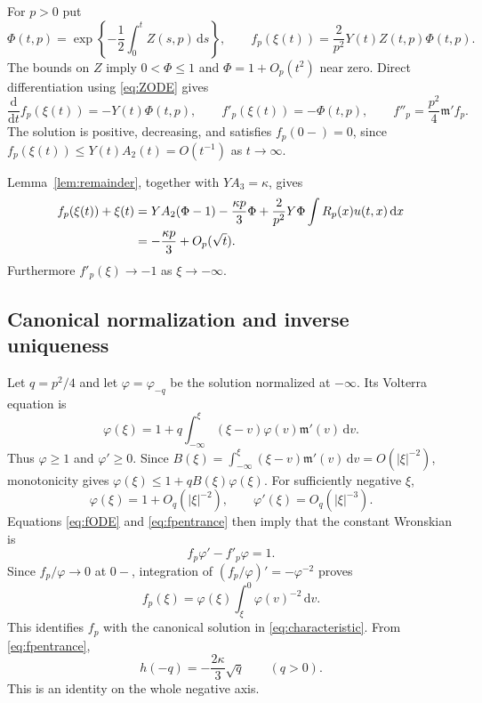 \documentclass[11pt,letterpaper,reqno]{amsart}
\theoremstyle{plain}
\newcommand{\dd}{\,\mathrm d}
\begin{document}
For $p>0$ put
\begin{equation}\label{eq:Phi}
 \Phi(t,p)=\exp\left\{-\frac12\int_0^tZ(s,p)\dd s\right\},\qquad
 f_p(\xi(t))=\frac2{p^2}Y(t)Z(t,p)\Phi(t,p).
\end{equation}
The bounds on $Z$ imply $0<\Phi\le1$ and $\Phi=1+O_p(t^2)$ near zero. Direct differentiation using \eqref{eq:ZODE} gives
\begin{equation}\label{eq:fODE}
 \frac{\mathrm d}{\mathrm dt}f_p(\xi(t))=-Y(t)\Phi(t,p),\qquad
 f'_p(\xi(t))=-\Phi(t,p),\qquad
 f''_p=\frac{p^2}{4}\mathfrak m'f_p.
\end{equation}
The solution is positive, decreasing, and satisfies $f_p(0-)=0$, since
$f_p(\xi(t))\le Y(t)A_2(t)=O(t^{-1})$ as $t\to\infty$.

Lemma~\ref{lem:remainder}, together with $YA_3=\kappa$, gives
\begin{align}\label{eq:fpentrance}
 f_p(\xi(t))+\xi(t)
 &=YA_2(\Phi-1)-\frac{\kappa p}{3}\Phi
   +\frac2{p^2}Y\Phi\int R_p(x)u(t,x)\dd x\notag\\
 &=-\frac{\kappa p}{3}+O_p(\sqrt t).
\end{align}
Furthermore $f'_p(\xi)\to-1$ as $\xi\to-\infty$.

\subsection{Canonical normalization and inverse uniqueness}
Let $q=p^2/4$ and let $\varphi=\varphi_{-q}$ be the solution normalized at $-\infty$. Its Volterra equation is
\[
 \varphi(\xi)=1+q\int_{-\infty}^\xi(\xi-v)\varphi(v)\mathfrak m'(v)\dd v.
\]
Thus $\varphi\ge1$ and $\varphi'\ge0$. Since
$B(\xi)=\int_{-\infty}^\xi(\xi-v)\mathfrak m'(v)\dd v=O(|\xi|^{-2})$, monotonicity gives
$\varphi(\xi)\le1+qB(\xi)\varphi(\xi)$. For sufficiently negative $\xi$,
\[
 \varphi(\xi)=1+O_q(|\xi|^{-2}),\qquad
 \varphi'(\xi)=O_q(|\xi|^{-3}).
\]
Equations \eqref{eq:fODE} and \eqref{eq:fpentrance} then imply that the constant Wronskian is
\[
 f_p\varphi'-f'_p\varphi=1.
\]
Since $f_p/\varphi\to0$ at $0-$, integration of $(f_p/\varphi)'=-\varphi^{-2}$ proves
\[
 f_p(\xi)=\varphi(\xi)\int_\xi^0\varphi(v)^{-2}\dd v.
\]
This identifies $f_p$ with the canonical solution in \eqref{eq:characteristic}. From \eqref{eq:fpentrance},
\begin{equation}\label{eq:h}
 h(-q)=-\frac{2\kappa}{3}\sqrt q\qquad(q>0).
\end{equation}
This is an identity on the whole negative axis.
\end{document}
